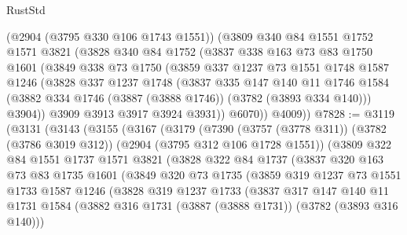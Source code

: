 \begin{lexlean}{RustStd}
\begin{coremodule}
      (@2904 (@3795 @330 @106 @1743 @1551))
      (@3809
        @340
        @84
        @1551
        @1752
        @1571
        @3821
        (@3828
          @340
          @84
          @1752
          (@3837
            @338
            @163
            @73
            @83
            @1750
            @1601
            (@3849
              @338
              @73
              @1750
              (@3859
                @337
                @1237
                @73
                @1551
                @1748
                @1587
                @1246
                (@3828
                  @337
                  @1237
                  @1748
                  (@3837
                    @335
                    @147
                    @140
                    @11
                    @1746
                    @1584
                    (@3882 @334 @1746 (@3887 (@3888 @1746)) (@3782 (@3893 @334 @140)))
                    @3904))
                @3909
                @3913
                @3917
                @3924
                @3931))
            @6070))
        @4009))
@7828 := @3119
    (@3131
      (@3143
        (@3155
          (@3167
            (@3179
              (@7390
                (@3757 (@3778 @311))
                (@3782 (@3786 @3019 @312))
                (@2904 (@3795 @312 @106 @1728 @1551))
                (@3809
                  @322
                  @84
                  @1551
                  @1737
                  @1571
                  @3821
                  (@3828
                    @322
                    @84
                    @1737
                    (@3837
                      @320
                      @163
                      @73
                      @83
                      @1735
                      @1601
                      (@3849
                        @320
                        @73
                        @1735
                        (@3859
                          @319
                          @1237
                          @73
                          @1551
                          @1733
                          @1587
                          @1246
                          (@3828
                            @319
                            @1237
                            @1733
                            (@3837
                              @317
                              @147
                              @140
                              @11
                              @1731
                              @1584
                              (@3882 @316 @1731 (@3887 (@3888 @1731)) (@3782 (@3893 @316 @140)))

\end{coremodule}
\end{lexlean}
